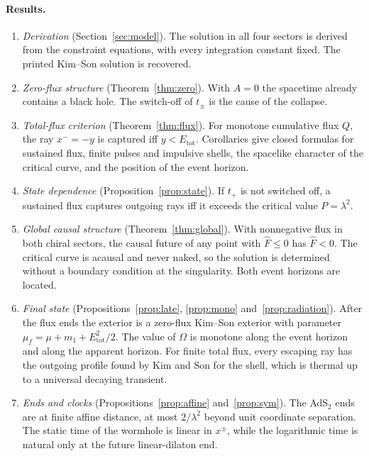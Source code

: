 \documentclass[11pt]{article}
\theoremstyle{remark}
\newcommand{\Etot}{E_{\mathrm{tot}}}
\newcommand{\Fh}{\widehat F}
\begin{document}
\paragraph{Results.}
\begin{enumerate}
\item \emph{Derivation} (Section~\ref{sec:model}). The solution in all four sectors is derived from the constraint equations, with every integration constant fixed. The printed Kim--Son solution is recovered.
\item \emph{Zero-flux structure} (Theorem~\ref{thm:zero}). With $A=0$ the spacetime already contains a black hole. The switch-off of $t_\pm$ is the cause of the collapse.
\item \emph{Total-flux criterion} (Theorem~\ref{thm:flux}). For monotone cumulative flux $Q$, the ray $x^-=-y$ is captured iff $y<\Etot$. Corollaries give closed formulas for sustained flux, finite pulses and impulsive shells, the spacelike character of the critical curve, and the position of the event horizon.
\item \emph{State dependence} (Proposition~\ref{prop:state}). If $t_+$ is not switched off, a sustained flux captures outgoing rays iff it exceeds the critical value $P=\lambda^2$.
\item \emph{Global causal structure} (Theorem~\ref{thm:global}). With nonnegative flux in both chiral sectors, the causal future of any point with $\Fh\le0$ has $\Fh<0$. The critical curve is acausal and never naked, so the solution is determined without a boundary condition at the singularity. Both event horizons are located.
\item \emph{Final state} (Propositions~\ref{prop:late}, \ref{prop:mono} and~\ref{prop:radiation}). After the flux ends the exterior is a zero-flux Kim--Son exterior with parameter $\mu_f=\mu+m_1+\Etot^2/2$. The value of $\Omega$ is monotone along the event horizon and along the apparent horizon. For finite total flux, every escaping ray has the outgoing profile found by Kim and Son for the shell, which is thermal up to a universal decaying transient.
\item \emph{Ends and clocks} (Propositions~\ref{prop:affine} and~\ref{prop:sym}). The AdS$_2$ ends are at finite affine distance, at most $2/\lambda^2$ beyond unit coordinate separation. The static time of the wormhole is linear in $x^\pm$, while the logarithmic time is natural only at the future linear-dilaton end.
\end{enumerate}
\end{document}
